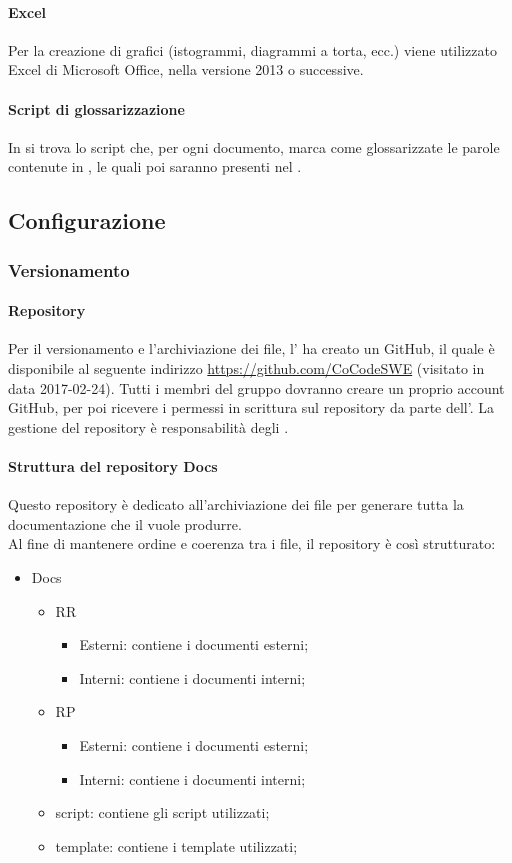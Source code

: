  \paragraph{Excel}
Per la creazione di grafici (istogrammi, diagrammi a torta, ecc.) viene utilizzato Excel di Microsoft Office, nella versione 2013 o successive.
\paragraph{Script di glossarizzazione}

In \GloScript{} si trova lo script che, per ogni documento, marca come glossarizzate le parole contenute in , le quali poi saranno presenti nel \Gldoc.
\subsection{Configurazione}
\subsubsection{Versionamento}
\paragraph{Repository}

Per il versionamento e l'archiviazione dei file, l'\AMM{} ha creato un  GitHub, il quale è disponibile al seguente indirizzo \url{https://github.com/CoCodeSWE} (visitato in data 2017-02-24). Tutti i membri del gruppo dovranno creare un proprio account GitHub, per poi ricevere i permessi in scrittura sul repository da parte dell'\AMM.
La gestione del repository è responsabilità degli \AMMP.
\paragraph{Struttura del repository Docs}
Questo repository è dedicato all'archiviazione dei file per generare tutta la documentazione che il  vuole produrre.\\
Al fine di mantenere ordine e coerenza tra i file, il repository è così strutturato:
\begin{itemize}
	\item Docs
	\begin{itemize}
		\item RR
		\begin{itemize}
			\item Esterni: contiene i documenti esterni;
			\item Interni: contiene i documenti interni;
		\end{itemize}
		\item RP
		\begin{itemize}
			\item Esterni: contiene i documenti esterni;
			\item Interni: contiene i documenti interni;
		\end{itemize}
		\item script: contiene gli script utilizzati;
		\item template: contiene i template utilizzati;
	\end{itemize}
\end{itemize}
